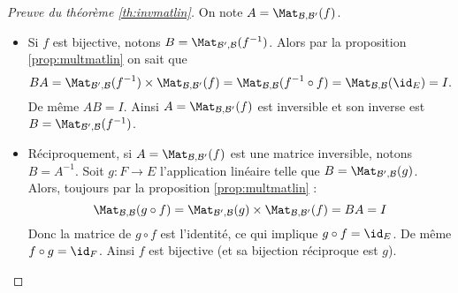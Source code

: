 \documentclass[class=report,crop=false]{standalone}
\begin{document}
\begin{proof}[Preuve du théorème \ref{th:invmatlin}]
On note $A = \Mat_{\mathcal{B},\mathcal{B}'} (f)$.

\begin{itemize}
  \item Si $f$ est bijective, notons $B = \Mat_{\mathcal{B}',\mathcal{B}} (f^{-1})$.
  Alors par la proposition \ref{prop:multmatlin} on sait que
  $$BA = \Mat_{\mathcal{B}',\mathcal{B}} (f^{-1}) \times \Mat_{\mathcal{B},\mathcal{B}'} (f)
       = \Mat_{\mathcal{B},\mathcal{B}} (f^{-1} \circ f)
       = \Mat_{\mathcal{B},\mathcal{B}} (\id_E) = I.$$
  De même $AB=I$. Ainsi $A= \Mat_{\mathcal{B},\mathcal{B}'} (f)$ est inversible et son inverse est
  $B = \Mat_{\mathcal{B}',\mathcal{B}} (f^{-1})$.

  \item Réciproquement, si $A = \Mat_{\mathcal{B},\mathcal{B}'} (f)$ est une matrice inversible,
  notons $B = A^{-1}$. Soit $g : F \to E$ l'application linéaire telle que
  $B = \Mat_{\mathcal{B}',\mathcal{B}} (g)$.
  Alors, toujours par la proposition \ref{prop:multmatlin} :
  $$\Mat_{\mathcal{B},\mathcal{B}} (g \circ f)
  = \Mat_{\mathcal{B}',\mathcal{B}} (g) \times \Mat_{\mathcal{B},\mathcal{B}'} (f)
  = BA = I$$
  Donc la matrice de $g\circ f$ est l'identité, ce qui implique $g \circ f = \id_E$.
  De même $f \circ g = \id_F$. Ainsi $f$ est bijective (et sa bijection réciproque est $g$).
\end{itemize}
\end{proof}


\end{document}

